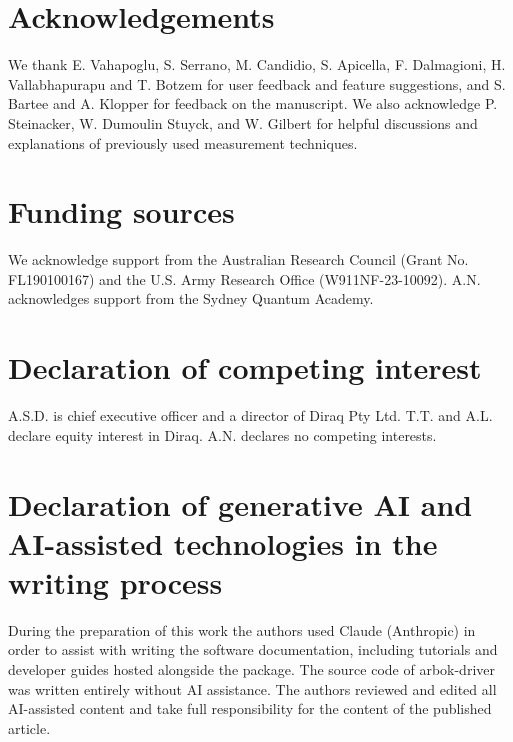 \documentclass[numbers, preprint, twocolumn,10pt]{elsarticle}
\begin{document}
\section*{Acknowledgements}
\noindent
We thank E. Vahapoglu, S. Serrano, M. Candidio, S. Apicella, F. Dalmagioni, H. Vallabhapurapu and T. Botzem for user feedback and feature suggestions, and S. Bartee and A. Klopper for feedback on the manuscript. We also acknowledge P. Steinacker, W. Dumoulin Stuyck, and W. Gilbert for helpful discussions and explanations of previously used measurement techniques.

\section*{Funding sources}
\noindent
We acknowledge support from
the Australian Research Council (Grant No. FL190100167) and the U.S. Army Research Office
(W911NF-23-10092). A.N. acknowledges support from the Sydney Quantum Academy.

\section*{Declaration of competing interest}
\noindent 
A.S.D. is chief executive officer and a director of Diraq Pty Ltd.
T.T. and A.L. declare equity interest in Diraq.
A.N. declares no competing interests.

\section*{Declaration of generative AI and AI-assisted technologies in the writing process}
\noindent
During the preparation of this work the authors used Claude (Anthropic) in order to assist with writing the software documentation, including tutorials and developer guides hosted alongside the package. The source code of arbok-driver was written entirely without AI assistance. The authors reviewed and edited all AI-assisted content and take full responsibility for the content of the published article.




\clearpage
\onecolumn

\appendix
\end{document}
